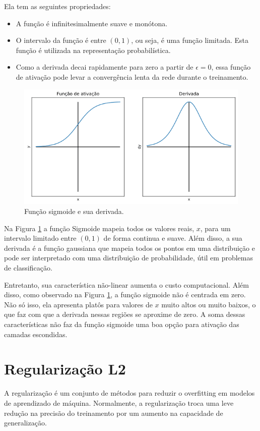 \documentclass[12pt,a4paper,oneside]{report}
\newcommand{\fig}[1]{Figura \ref{#1}}
\begin{document}
	Ela tem as seguintes propriedades:
	\begin{itemize}
		\item A função é infinitesimalmente suave e monótona.
		\item O intervalo da função é entre $(0,1)$, ou seja, é uma função limitada. Esta função é utilizada na representação probabilística.
		\item Como a derivada decai rapidamente para zero a partir de $\epsilon = 0$, essa função de ativação pode levar a convergência lenta da rede durante o treinamento\cite{ray2023deeplearningcomputationalphysics}.
	\end{itemize}

\begin{figure}[th!]
	\centering
	\includegraphics[width=0.6\linewidth]{img/sigmoide}
	\caption[Função sigmoide e sua derivada.]{Função sigmoide e sua derivada.}
	\label{fig:sigmoide}
\end{figure}

Na \fig{fig:sigmoide} a função Sigmoide mapeia todos os valores reais, $x$, para um intervalo limitado entre $(0,1)$ de forma continua e suave. Além disso, a sua derivada é a função gaussiana que mapeia todos os pontos em uma distribuição e pode ser interpretado com uma distribuição de probabilidade, útil em problemas de classificação. 

Entretanto, sua característica não-linear aumenta o custo computacional. Além disso, como observado na \fig{fig:sigmoide}, a função sigmoide não é centrada em zero. Não só isso, ela apresenta platôs para valores de $x$ muito altos ou muito baixos, o que faz com que a derivada nessas regiões se aproxime de zero. A soma dessas características não faz da função sigmoide uma boa opção para ativação das camadas escondidas.
	
\section{Regularização L2}

A regularização é um conjunto de métodos para reduzir o overfitting em modelos de aprendizado de máquina. Normalmente, a regularização troca uma leve redução na precisão do treinamento por um aumento na capacidade de generalização\cite{murel:2023}.
\end{document}
